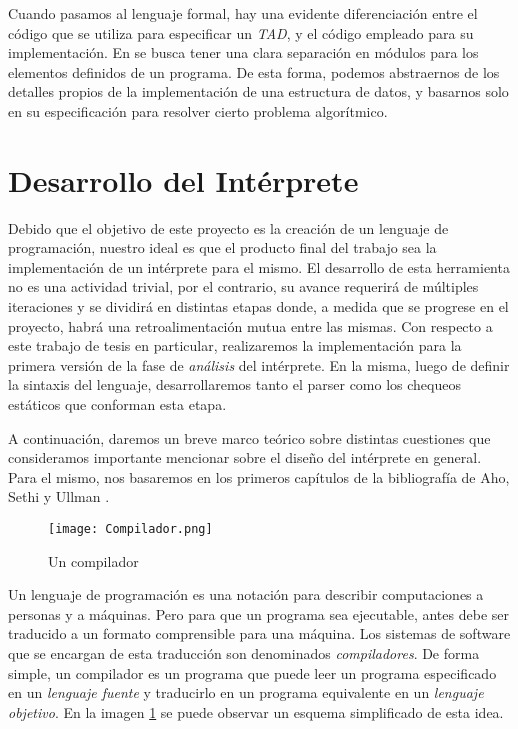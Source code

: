 Cuando pasamos al lenguaje formal, hay una evidente diferenciación entre el código que se utiliza para especificar un \textit{TAD}, y el código empleado para su implementación.
En \Lenguaje{} se busca tener una clara separación en módulos para los elementos definidos de un programa.
De esta forma, podemos abstraernos de los detalles propios de la implementación de una estructura de datos, y basarnos solo en su especificación para resolver cierto problema algorítmico.

\section{Desarrollo del Intérprete}

Debido que el objetivo de este proyecto es la creación de un lenguaje de programación, nuestro ideal es que el producto final del trabajo sea la implementación de un intérprete para el mismo.
El desarrollo de esta herramienta no es una actividad trivial, por el contrario, su avance requerirá de múltiples iteraciones y se dividirá en distintas etapas donde, a medida que se progrese en el proyecto, habrá una retroalimentación mutua entre las mismas.
Con respecto a este trabajo de tesis en particular, realizaremos la implementación para la primera versión de la fase de \textit{análisis} del intérprete.
En la misma, luego de definir la sintaxis del lenguaje, desarrollaremos tanto el parser como los chequeos estáticos que conforman esta etapa.

A continuación, daremos un breve marco teórico sobre distintas cuestiones que consideramos importante mencionar sobre el diseño del intérprete en general.
Para el mismo, nos basaremos en los primeros capítulos de la bibliografía de Aho, Sethi y Ullman \cite{Dragon}.

\begin{figure}[h]
\centering
\texttt{[image: Compilador.png]}
\caption{Un compilador}
\label{Compilador}
\end{figure}

Un lenguaje de programación es una notación para describir computaciones a personas y a máquinas.
Pero para que un programa sea ejecutable, antes debe ser traducido a un formato comprensible para una máquina.
Los sistemas de software que se encargan de esta traducción son denominados \textit{compiladores}.
De forma simple, un compilador es un programa que puede leer un programa especificado en un \textit{lenguaje fuente} y traducirlo en un programa equivalente en un \textit{lenguaje objetivo}.
En la imagen \ref{Compilador} se puede observar un esquema simplificado de esta idea.

